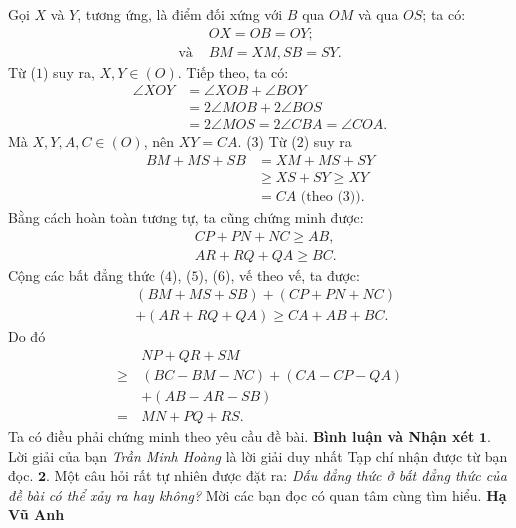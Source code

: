 \begin{multicols}{2}
\begin{figure}[H]
		\vspace*{-15pt}
	\end{figure}
	Gọi $X$ và $Y$, tương ứng, là điểm đối xứng với $B$ qua $OM$ và qua $OS$; ta có:
	\begin{align*}
		&OX = OB = OY; \tag{$1$}\\
		\text{và } &BM = XM, SB = SY. \tag{$2$}
	\end{align*}
	Từ ($1$) suy ra, $X, Y \in (O)$.
	\vskip 0.05cm
	Tiếp theo, ta có:
	\begin{align*}
		\angle XOY &= \angle XOB + \angle BOY \\
		&= 2\angle MOB + 2\angle BOS \\
		&= 2\angle MOS = 2\angle CBA = \angle COA.
	\end{align*}
	Mà $X, Y, A, C \in (O)$, nên $XY = CA$. \hfill ($3$)
	\vskip 0.05cm
	Từ ($2$) suy ra
	\begin{align*}
		BM + MS + SB &= XM + MS + SY \\
		&\ge XS + SY \ge XY \\
		&= CA \text{ (theo ($3$))}. \tag{$4$}  
	\end{align*}
	Bằng cách hoàn toàn tương tự, ta cũng chứng minh được:
	\begin{align*}
		&CP + PN + NC \ge AB,   \tag{$5$}\\
		&AR + RQ + QA \ge BC.  \tag{$6$}
	\end{align*}                      
	Cộng các bất đẳng thức ($4$), ($5$), ($6$), vế theo vế, ta được:
	\begin{align*}
		&(BM + MS + SB) + (CP + PN + NC) \\
		&+ (AR + RQ + QA) \ge CA + AB + BC.	
	\end{align*}
	Do đó
	\begin{align*}
		&NP + QR + SM\\
		\ge &(BC - BM - NC) + (CA - CP - QA) \\
		&+ (AB - AR - SB)\\
		= \,&MN + PQ + RS.
	\end{align*}
	Ta có điều phải chứng minh theo yêu cầu đề bài.
	\vskip 0.05cm
	\textbf{\color{thachthuctoanhoc}Bình luận và Nhận xét}
	\vskip 0.05cm
	$\pmb{1.}$ Lời giải của bạn \textit{Trần Minh Hoàng} là lời giải duy nhất Tạp chí nhận được từ bạn đọc.
	\vskip 0.05cm
	$\pmb{2.}$ Một câu hỏi rất tự nhiên được đặt ra: \textit{Dấu đẳng thức ở bất đẳng thức của đề bài có thể xảy ra hay không?} Mời các bạn đọc có quan tâm cùng tìm hiểu.
	\vskip 0.05cm
	\hfill	\textbf{\color{thachthuctoanhoc}Hạ Vũ Anh}
	\vskip 0.05cm

\end{multicols}
